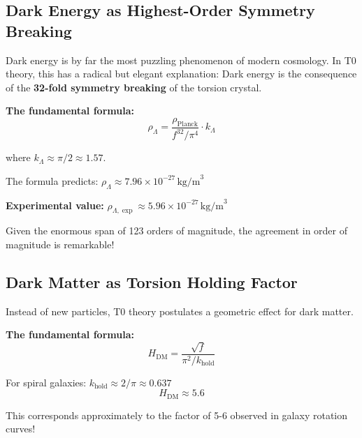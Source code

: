 	\subsection{Dark Energy as Highest-Order Symmetry Breaking}
	
	Dark energy is by far the most puzzling phenomenon of modern cosmology. In T0 theory, this has a radical but elegant explanation: Dark energy is the consequence of the \textbf{32-fold symmetry breaking} of the torsion crystal.
	
	\textbf{The fundamental formula:}
	\begin{equation}
		\boxed{\rho_\Lambda = \frac{\rho_{\text{Planck}}}{f^{32} / \pi^4} \cdot k_\Lambda}
	\end{equation}
	
	where \(k_\Lambda \approx \pi/2 \approx 1.57\).
	
	The formula predicts: \(\rho_\Lambda \approx 7.96 \times 10^{-27}\,\text{kg/m}^3\)
	
	\textbf{Experimental value:} \(\rho_{\Lambda,\exp} \approx 5.96 \times 10^{-27}\,\text{kg/m}^3\)
	
	Given the enormous span of 123 orders of magnitude, the agreement in order of magnitude is remarkable!
	
	\subsection{Dark Matter as Torsion Holding Factor}
	
	Instead of new particles, T0 theory postulates a geometric effect for dark matter.
	
	\textbf{The fundamental formula:}
	\begin{equation}
		\boxed{H_{\text{DM}} = \frac{\sqrt{f}}{\pi^2/k_{\text{hold}}}}
	\end{equation}
	
	For spiral galaxies: \(k_{\text{hold}} \approx 2/\pi \approx 0.637\)
	\begin{equation}
		H_{\text{DM}} \approx 5.6
	\end{equation}
	
	This corresponds approximately to the factor of 5-6 observed in galaxy rotation curves!
